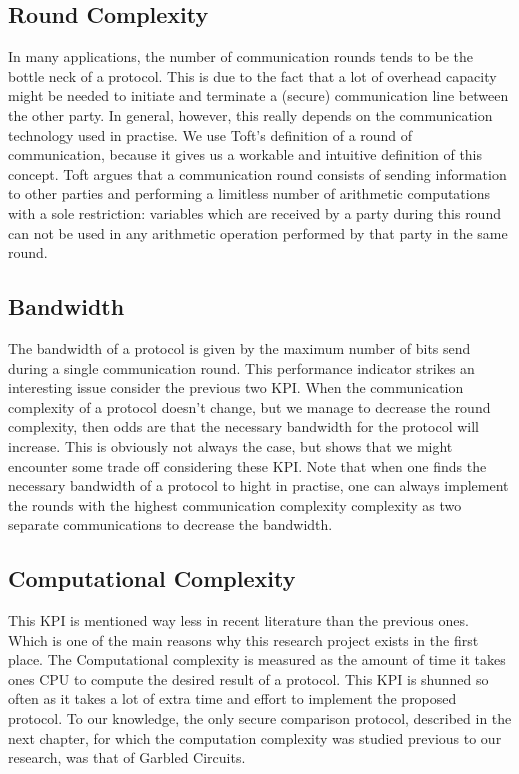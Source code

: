 \subsection{Round Complexity}
In many applications, the number of communication rounds tends to be the bottle neck of a protocol. This is due to the fact that a lot of overhead capacity might be needed to initiate and terminate a (secure) communication line between the other party. In general, however, this really depends on the communication technology used in practise. We use Toft’s definition of a round of communication, because it gives us a workable and intuitive definition of this concept. Toft argues that a communication round consists of sending information to other parties and performing a limitless number of arithmetic computations with a sole restriction: variables which are received by a party during this round can not be used in any arithmetic operation performed by that party in the same round.

\subsection{Bandwidth}
The bandwidth of a protocol is given by the maximum number of bits send during a single communication round. This performance indicator strikes an interesting issue consider the previous two KPI. When the communication complexity of a protocol doesn’t change, but we manage to decrease the round complexity, then odds are that the necessary bandwidth for the protocol will increase. This is obviously not always the case, but shows that we might encounter some trade off considering these KPI. Note that when one finds the necessary bandwidth of a protocol to hight in practise, one can always implement the rounds with the highest communication complexity complexity as two separate communications to decrease the bandwidth.

\subsection{Computational Complexity}
This KPI is mentioned way less in recent literature than the previous ones. Which is one of the main reasons why this research project exists in the first place. The Computational complexity is measured as the amount of time it takes ones CPU to compute the desired result of a protocol. This KPI is shunned so often as it takes a lot of extra time and effort to implement the proposed protocol. To our knowledge, the only secure comparison protocol, described in the next chapter, for which the computation complexity was studied previous to our research, was that of Garbled Circuits.

